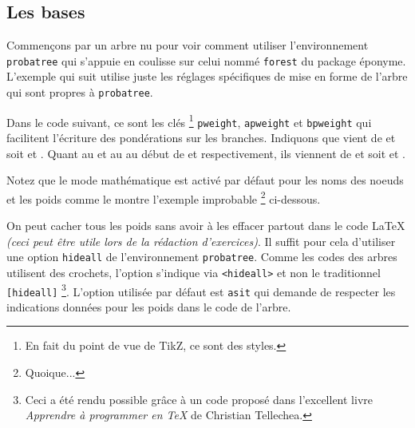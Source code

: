 \documentclass[12pt,a4paper]{article}
\begin{document}

\subsection{Les bases}


Commençons par un arbre nu pour voir comment utiliser l'environnement \verb+probatree+ qui s'appuie en coulisse sur celui nommé \verb+forest+ du package éponyme.
L'exemple qui suit utilise juste les réglages spécifiques de mise en forme de l'arbre qui sont propres à \verb+probatree+.






Dans le code suivant, ce sont les clés
\footnote{
	En fait du point de vue de TikZ, ce sont des styles.
}
\verb+pweight+, \verb+apweight+ et \verb+bpweight+ qui facilitent l'écriture des pondérations sur les branches.
Indiquons que  vient de  et  soit  et .
Quant au  et au  au début de  et  respectivement, ils viennent de  et  soit  et .



\begin{remark}
	Notez que le mode mathématique est activé par défaut pour les noms des noeuds et les poids comme le montre l'exemple improbable
	\footnote{
		Quoique...
	}
	ci-dessous.

\end{remark}





On peut cacher tous les poids sans avoir à les effacer partout dans le code \LaTeX{} \emph{(ceci peut être utile lors de la rédaction d'exercices)}.
Il suffit pour cela d'utiliser une option \verb#hideall# de l'environnement \verb+probatree+. Comme les codes des arbres utilisent des crochets, l'option s'indique via \verb#<hideall># et non le traditionnel \verb#[hideall]#
\footnote{
	Ceci a été rendu possible grâce à un code proposé dans l'excellent livre \emph{\og Apprendre à programmer en \TeX \fg} de Christian Tellechea.
}.
L'option utilisée par défaut est \verb#asit# qui demande de respecter les indications données pour les poids dans le code de l'arbre.
\end{document}
